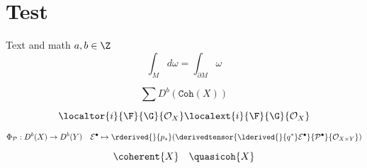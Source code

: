 \section{Test}
Text and math $a, b \in \Z$
\[
\int_{M} d\omega = \int_{\partial M } \omega
\]

\[
    \sum D^b(\mathtt{Coh}(X))
\]

\[
\localtor{i}{\F}{\G}{\mathcal O_X} \\
\localext{i}{\F}{\G}{\mathcal O_X}
\]

\[
    \Phi_\mathcal P : D^b(X) \to D^b(Y) \quad \mathcal E^\bullet \mapsto \rderived{}{p_*}(\derivedtensor{\lderived{}{q^*}\mathcal E^\bullet}{\mathcal P^\bullet}{\mathcal O_{X \times Y}})
\]

\[
    \coherent{X} \quad \quasicoh{X}
\]







